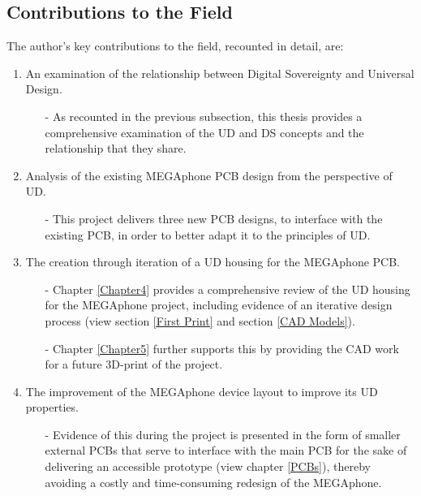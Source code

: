 \subsection{Contributions to the Field}

The author's key contributions to the field, recounted in detail, are:
\begin{enumerate}
    \item An examination of the relationship between Digital Sovereignty and Universal Design.
        \begin{enumerate}
        \item[-] As recounted in the previous subsection, this thesis provides a comprehensive examination of the UD and DS concepts and the relationship that they share.
        \end{enumerate} 
    \item Analysis of the existing MEGAphone PCB design from the perspective of UD.
        \begin{enumerate}
        \item[-] This project delivers three new PCB designs, to interface with the existing PCB, in order to better adapt it to the principles of UD.
        \end{enumerate} 
    \item The creation through iteration of a UD housing for the MEGAphone PCB.
        \begin{enumerate}
        \item[-] Chapter \ref{Chapter4} provides a comprehensive review of the UD housing for the MEGAphone project, including evidence of an iterative design process (view section \ref{First Print} and section \ref{CAD Models}).
        \item[-] Chapter \ref{Chapter5} further supports this by providing the CAD work for a future 3D-print of the project.
        \end{enumerate} 
    \item The improvement of the MEGAphone device layout to improve its UD properties.
        \begin{enumerate}
        \item[-] Evidence of this during the project is presented in the form of smaller external PCBs that serve to interface with the main PCB for the sake of delivering an accessible prototype (view chapter \ref{PCBs}), thereby avoiding a costly and time-consuming redesign of the MEGAphone.

\end{enumerate}
\end{enumerate}
